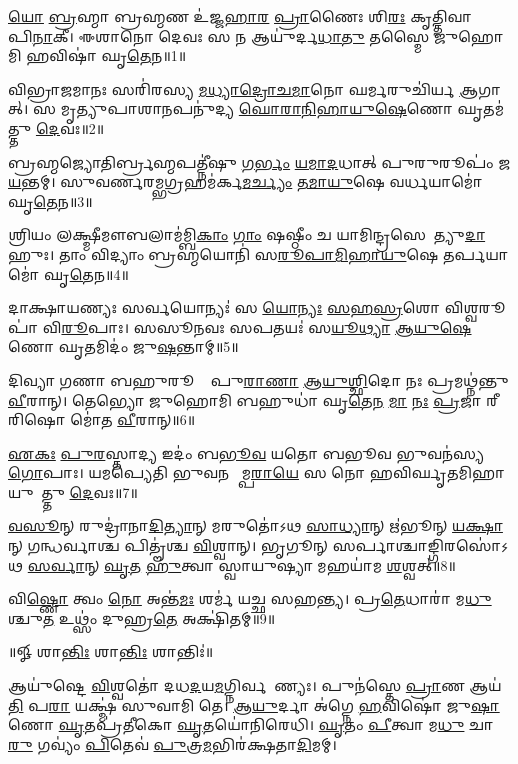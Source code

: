 

\ul{𑌯𑍋} \ul{𑌬𑍍𑌰}𑌹𑍍𑌮𑌾 𑌬𑍍𑌰𑌹𑍍𑌮𑌣 𑌉॑𑌜𑍍𑌜\ul{𑌹𑌾}\ul{𑌰} \ul{𑌪𑍍𑌰𑌾}𑌣𑍈𑌃 𑌶𑌿\ul{𑌰𑌃} 𑌕𑍃𑌤𑍍𑌤𑌿𑌵𑌾𑌸𑌾𑌃᳚ 𑌪𑌿\ul{𑌨𑌾}𑌕𑍀।
𑌈𑌶𑌾𑌨𑍋 𑌦𑍇𑌵𑌃 𑌸 𑌨 𑌆𑌯𑍁॑𑌰𑍍𑌦\ul{𑌧𑌾}\ul{𑌤𑍁} 𑌤𑌸𑍍𑌮𑍈 𑌜𑍁𑌹𑍋𑌮𑌿 𑌹𑌵𑌿𑌷𑌾॑ 𑌘𑍃\ul{𑌤𑍇}𑌨॥1॥

𑌵𑌿𑌭𑍍𑌰𑌾𑌜𑌮𑌾𑌨𑌃 𑌸𑌰𑌿॑𑌰𑌸𑍍𑌯 \ul{𑌮}\ul{𑌧𑍍𑌯𑌾}\ul{𑌦𑍍𑌰𑍋}\ul{𑌚}\ul{𑌮𑌾}𑌨𑍋 𑌘𑌰𑍍𑌮𑌰𑍁𑌚𑌿॑𑌰𑍍𑌯 \ul{𑌆}𑌗𑌾𑌤𑍍।
𑌸 𑌮𑍃𑌤𑍍𑌯𑍁𑌪𑌾𑌶𑌾𑌨𑌪𑌨𑍁॑𑌦𑍍𑌯 \ul{𑌘𑍋}\ul{𑌰𑌾}\ul{𑌨𑌿}\ul{𑌹𑌾}\ul{𑌯𑍁}\ul{𑌷𑍇}𑌣𑍋 𑌘𑍃𑌤𑌮॑𑌤𑍍𑌤𑍁 \ul{𑌦𑍇}𑌵𑌃॥2॥

𑌬𑍍𑌰𑌹𑍍𑌮𑌜𑍍𑌯𑍋𑌤𑌿𑌰𑍍𑌬𑍍𑌰𑌹𑍍𑌮𑌪𑌤𑍍𑌨𑍀॑𑌷𑍁  \ul{𑌗}\ul{𑌰𑍍𑌭𑌂} \ul{𑌯}\ul{𑌮𑌾}\ul{𑌦}𑌧𑌾𑌤𑍍 𑌪𑍁𑌰𑍁𑌰𑍂𑌪𑌂॑ 𑌜\ul{𑌯}𑌨𑍍𑌤𑌮𑍍।
𑌸𑍁𑌵𑌰𑍍𑌣𑌰𑌮𑍍𑌭𑌗𑍍𑌰𑌹𑌮॑𑌰𑍍𑌕\ul{𑌮}\ul{𑌰𑍍𑌚𑍍𑌯𑌂} \ul{𑌤}\ul{𑌮𑌾}\ul{𑌯𑍁}𑌷𑍇 𑌵𑌰𑍍𑌧𑌯𑌾𑌮𑍋॑ 𑌘𑍃\ul{𑌤𑍇}𑌨॥3॥

𑌶𑍍𑌰𑌿𑌯𑌂 𑌲𑌕𑍍𑌷𑍍𑌮𑍀𑌮𑍗𑌬𑌲𑌾𑌮॑𑌮𑍍𑌬𑌿\ul{𑌕𑌾𑌂} \ul{𑌗𑌾𑌂} 𑌷𑌷𑍍𑌠𑍀𑌂 𑌚 𑌯𑌾𑌮𑌿𑌨𑍍𑌦𑍍𑌰𑌸𑍇𑌨𑍇᳚𑌤𑍍𑌯𑍁\ul{𑌦𑌾}𑌹𑍁𑌃।
𑌤𑌾𑌂 𑌵𑌿𑌦𑍍𑌯𑌾𑌂 𑌬𑍍𑌰𑌹𑍍𑌮𑌯𑍋𑌨𑌿॑ 𑌸\ul{𑌰𑍂}\ul{𑌪𑌾}\ul{𑌮𑌿}\ul{𑌹𑌾}\ul{𑌯𑍁}𑌷𑍇 𑌤𑌰𑍍𑌪𑌯𑌾𑌮𑍋॑ 𑌘𑍃\ul{𑌤𑍇}𑌨॥4॥

𑌦𑌾𑌕𑍍𑌷𑌾𑌯𑌣𑍍𑌯𑌃 𑌸𑌰𑍍𑌵𑌯𑍋𑌨𑍍𑌯𑌃॑ 𑌸 \ul{𑌯𑍋}\ul{𑌨𑍍𑌯𑌃} \ul{𑌸}\ul{𑌹}\ul{𑌸𑍍𑌰}𑌶𑍋 𑌵𑌿𑌶𑍍𑌵𑌰𑍂𑌪𑌾॑ 𑌵𑌿\ul{𑌰𑍂}𑌪𑌾𑌃।
𑌸𑌸𑍂𑌨𑌵𑌃 𑌸𑌪𑌤𑌯𑌃॑ 𑌸\ul{𑌯𑍂}\ul{𑌥𑍍𑌯𑌾} \ul{𑌆}\ul{𑌯𑍁}\ul{𑌷𑍇}𑌣𑍋 𑌘𑍃𑌤𑌮𑌿𑌦𑌂॑ 𑌜𑍁\ul{𑌷}𑌨𑍍𑌤𑌾𑌮𑍍॥5॥

𑌦𑌿𑌵𑍍𑌯𑌾 𑌗𑌣𑌾 𑌬𑌹𑍁𑌰𑍂𑌪𑌾𑌃᳚ 𑌪𑍁\ul{𑌰𑌾}\ul{𑌣𑌾} \ul{𑌆}\ul{𑌯𑍁}\ul{𑌶𑍍𑌛𑌿}𑌦𑍋 𑌨𑌃 𑌪𑍍𑌰𑌮𑌥𑍍𑌨॑𑌨𑍍𑌤𑍁 \ul{𑌵𑍀}𑌰𑌾𑌨𑍍।
𑌤𑍇𑌭𑍍𑌯𑍋 𑌜𑍁𑌹𑍋𑌮𑌿 𑌬𑌹𑍁𑌧𑌾॑ 𑌘𑍃\ul{𑌤𑍇}\ul{𑌨} \ul{𑌮𑌾} \ul{𑌨𑌃} \ul{𑌪𑍍𑌰}𑌜𑌾 𑌰𑍀𑌰𑌿𑌷𑍋 𑌮𑍋॑𑌤 \ul{𑌵𑍀}𑌰𑌾𑌨𑍍॥6॥

\ul{𑌏}\ul{𑌕𑌃} \ul{𑌪𑍁}\ul{𑌰}𑌸𑍍𑌤𑌾𑌦𑍍𑌯 𑌇𑌦𑌂॑ 𑌬\ul{𑌭𑍂}\ul{𑌵} 𑌯𑌤𑍋 𑌬𑌭𑍂𑌵 𑌭𑍁𑌵𑌨॑𑌸𑍍𑌯 \ul{𑌗𑍋}𑌪𑌾𑌃।
𑌯𑌮𑌪𑍍𑌯𑍇𑌤𑌿 𑌭𑍁𑌵𑌨 𑌸𑌾᳚𑌮𑍍𑌪\ul{𑌰𑌾}\ul{𑌯𑍇} 𑌸 𑌨𑍋 𑌹𑌵𑌿𑌰𑍍𑌘𑍃𑌤𑌮𑌿𑌹𑌾𑌯𑍁𑌷𑍇᳚𑌤𑍍𑌤𑍁 \ul{𑌦𑍇}𑌵𑌃॥7॥

\ul{𑌵}\ul{𑌸𑍂}𑌨𑍍 𑌰𑍁𑌦𑍍𑌰𑌾॑𑌨𑌾\ul{𑌦𑌿}\ul{𑌤𑍍𑌯𑌾}𑌨𑍍 𑌮𑌰𑍁𑌤𑍋॑𑌽𑌥 \ul{𑌸𑌾}\ul{𑌧𑍍𑌯𑌾}𑌨𑍍 𑌋॑𑌭𑍂𑌨𑍍 \ul{𑌯}\ul{𑌕𑍍𑌷𑌾}𑌨𑍍 𑌗𑌨𑍍𑌧𑌰𑍍𑌵𑌾𑌶𑍍𑌚 𑌪𑌿𑌤𑍄॑𑌶𑍍𑌚 \ul{𑌵𑌿}𑌶𑍍𑌵𑌾𑌨𑍍।
 𑌭𑍃𑌗𑍂𑌨𑍍 𑌸𑌰𑍍𑌪𑌾𑌶𑍍𑌚𑌾𑌙𑍍𑌗𑌿𑌰𑌸𑍋॑𑌽𑌥 \ul{𑌸}\ul{𑌰𑍍𑌵𑌾}𑌨𑍍 \ul{𑌘𑍃}\ul{𑌤}\ul{} \ul{𑌹𑍁}𑌤𑍍𑌵𑌾 𑌸𑍍𑌵𑌾𑌯𑍁𑌷𑍍𑌯𑌾 𑌮𑌹𑌯𑌾॑𑌮 \ul{𑌶}𑌶𑍍𑌵𑌤𑍍॥8॥

𑌵𑌿\ul{𑌷𑍍𑌣𑍋} 𑌤𑍍𑌵𑌂 \ul{𑌨𑍋} 𑌅𑌨𑍍𑌤॑\ul{𑌮𑌃} 𑌶𑌰𑍍𑌮॑ 𑌯𑌚𑍍𑌛 𑌸𑌹𑌨𑍍𑌤𑍍𑌯।
𑌪𑍍𑌰\ul{𑌤𑍇}𑌧𑌾𑌰𑌾॑ 𑌮\ul{𑌧𑍁}𑌶𑍍𑌚𑍁\ul{𑌤} 𑌉𑌥𑍍𑌸𑌂॑ 𑌦𑍁𑌹𑍍𑌰\ul{𑌤𑍇} 𑌅𑌕𑍍𑌷𑌿॑𑌤𑌮𑍍॥9॥

\centerline{॥𑍐 𑌶𑌾\ul{𑌨𑍍𑌤𑌿𑌃} 𑌶𑌾\ul{𑌨𑍍𑌤𑌿𑌃} 𑌶𑌾𑌨𑍍𑌤𑌿𑌃॑॥}
\vspace{-0.25ex}
\closesection
\vspace{-0.25ex}
𑌆𑌯𑍁॑𑌷𑍍𑌟𑍇 \ul{𑌵𑌿}𑌶𑍍𑌵𑌤𑍋॑ 𑌦𑌧\ul{𑌦}𑌯\ul{𑌮}𑌗𑍍𑌨𑌿𑌰𑍍𑌵𑌰𑍇᳚𑌣𑍍𑌯𑌃। 𑌪𑍁𑌨॑𑌸𑍍𑌤𑍇 \ul{𑌪𑍍𑌰𑌾}𑌣 𑌆𑌯॑\ul{𑌤𑌿} 𑌪\ul{𑌰𑌾} 𑌯𑌕𑍍𑌷𑍍𑌮॑ 𑌸𑍁𑌵𑌾𑌮𑌿 𑌤𑍇। \ul{𑌆}\ul{𑌯𑍁}𑌰𑍍𑌦𑌾 𑌅॑𑌗𑍍𑌨𑍇 \ul{𑌹}𑌵𑌿𑌷𑍋॑ 𑌜𑍁\ul{𑌷𑌾}𑌣𑍋 \ul{𑌘𑍃}𑌤𑌪𑍍𑌰॑𑌤𑍀𑌕𑍋 \ul{𑌘𑍃}𑌤𑌯𑍋॑𑌨𑌿𑌰𑍇𑌧𑌿। \ul{𑌘𑍃}𑌤𑌂 \ul{𑌪𑍀}𑌤𑍍𑌵𑌾 𑌮\ul{𑌧𑍁} 𑌚𑌾\ul{𑌰𑍁} 𑌗𑌵𑍍𑌯𑌂॑ \ul{𑌪𑌿}𑌤𑍇𑌵॑ \ul{𑌪𑍁}𑌤𑍍𑌰\ul{𑌮}𑌭𑌿𑌰॑𑌕𑍍𑌷𑌤𑌾\ul{𑌦𑌿}𑌮𑌮𑍍।
